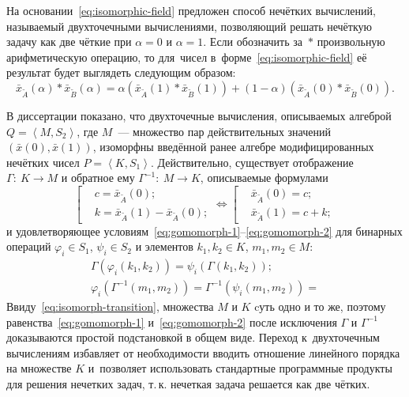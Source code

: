 На основании~\eqref{eq:isomorphic-field} предложен способ нечётких вычислений, называемый двухточечными вычислениями, позволяющий решать нечёткую задачу как две чёткие при $\alpha=0$ и $\alpha=1$. Если обозначить за~$*$ произвольную арифметическую операцию, то для~чисел в~форме~\eqref{eq:isomorphic-field} её результат будет выглядеть следующим образом:
\begin{equation}
\label{eq:two-point-calculations}
  \bar{x}_{\tilde A}\left( \alpha \right)*\bar{x}_{\tilde B}\left(\alpha \right)=\alpha \left(\bar{x}_{\tilde A}\left( 1 \right)*\bar{x}_{\tilde B}\left(1 \right) \right)+\left(1-\alpha \right)\left(\bar{x}_{\tilde A}\left(0 \right)*\bar{x}_{\tilde B}\left(0 \right) \right).
\end{equation}

В диссертации показано, что двухточечные вычисления, описываемых алгеброй $Q=\left\langle M, S_2 \right\rangle$, где $M$~--- множество пар действительных значений $\left(\bar x\left(0\right), \bar x \left(1\right) \right)$, изоморфны введённой ранее алгебре модифицированных нечётких чисел $P=\left\langle K,S_1 \right\rangle$. Действительно, существует отображение $\Gamma:\ K \to M$ и обратное ему $\Gamma^{-1}:\ M \to K$, описываемые формулами 
\begin{equation}
  \label{eq:isomorph-transition}
  \left[ \begin{aligned}
    & c=\bar{x}_{\tilde A}\left( 0 \right); \\ 
    & k=\bar{x}_{\tilde A}\left( 1 \right)-\bar{x}_{\tilde A}\left( 0 \right);
  \end{aligned} \right.
  \Leftrightarrow 
  \left[ \begin{aligned}
    & \bar{x}_{\tilde A}\left( 0 \right)=c; \\ 
    & \bar{x}_{\tilde A}\left( 1 \right)=c+k;
  \end{aligned} \right.
\end{equation}
и удовлетворяющее условиям~\eqref{eq:gomomorph-1}--\eqref{eq:gomomorph-2} для бинарных операций $\varphi_i \in S_1$, $\psi_i \in S_2$ и элементов $k_1, k_2 \in K$, $m_1, m_2 \in M$:
\begin{gather}
  \label{eq:gomomorph-1}
  \Gamma\left( \varphi_i \left( k_1, k_2 \right) \right) = \psi_i\left( \Gamma \left(k_1, k_2 \right) \right); \\
  \label{eq:gomomorph-2}
  \varphi_i\left( \Gamma^{-1} \left(m_1, m_2 \right) \right) = \Gamma^{-1}\left( \psi_i \left(m_1, m_2 \right) \right) = 
\end{gather}
Ввиду~\eqref{eq:isomorph-transition}, множества $M$ и $K$ cуть одно и то же, поэтому равенства~\eqref{eq:gomomorph-1} и~\eqref{eq:gomomorph-2} после исключения $\Gamma$ и $\Gamma^{-1}$ доказываются простой подстановкой в общем виде. Переход к~двухточечным вычислениям избавляет от необходимости вводить отношение линейного порядка на множестве $K$ и~позволяет использовать стандартные программные продукты для решения нечетких задач, т.\,к. нечеткая задача решается как две чётких.

